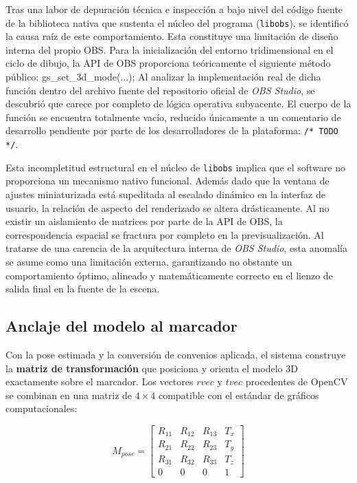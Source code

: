 Tras una labor de depuración técnica e inspección a bajo nivel del código fuente de la biblioteca nativa que sustenta el núcleo del programa (\texttt{libobs}), se identificó la causa raíz de este comportamiento. Esta constituye una limitación de diseño interna del propio OBS. 
Para la inicialización del entorno tridimensional en el ciclo de dibujo, la API de OBS proporciona teóricamente el siguiente método público:
gs_set_3d_mode(...);
Al analizar la implementación real de dicha función dentro del archivo fuente del repositorio oficial de \textit{OBS Studio}, se descubrió que carece por completo de lógica operativa subyacente. El cuerpo de la función se encuentra totalmente vacío, reducido únicamente a un comentario de desarrollo pendiente por parte de los desarrolladores de la plataforma: \texttt{/* TODO */}.

Esta incompletitud estructural en el núcleo de \texttt{libobs} implica que el software no proporciona un mecanismo nativo funcional. Además dado que la ventana de ajustes miniaturizada está supeditada al escalado dinámico en la interfaz de usuario, la relación de aspecto del renderizado se altera drásticamente. Al no existir un aislamiento de matrices por parte de la API de OBS, la correspondencia espacial se fractura por completo en la previsualización. Al tratarse de una carencia de la arquitectura interna de \textit{OBS Studio}, esta anomalía se asume como una limitación externa, garantizando no obstante un comportamiento óptimo, alineado y matemáticamente correcto en el lienzo de salida final en la fuente de la escena.

\subsection{Anclaje del modelo al marcador}
\label{subsec:anclaje_modelo}

Con la pose estimada y la conversión de convenios aplicada, el sistema construye la \textbf{matriz de transformación} que posiciona y orienta el modelo 3D exactamente sobre el marcador. Los vectores $rvec$ y $tvec$ procedentes de OpenCV se combinan en una matriz de $4\times4$ compatible con el estándar de gráficos computacionales:

\[ M_{pose} = \begin{bmatrix}
R_{11} & R_{12} & R_{13} & T_x \\
R_{21} & R_{22} & R_{23} & T_y \\
R_{31} & R_{32} & R_{33} & T_z \\
0 & 0 & 0 & 1
\end{bmatrix} \]

